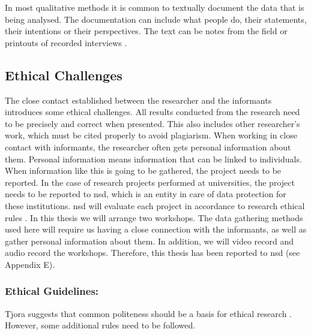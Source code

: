 In most qualitative methods it is common to textually document the data that is being analysed. The documentation can include what people do, their statements, their intentions or their perspectives. The text can be notes from the field or printouts of  recorded interviews \cite{qualitative}. 

\subsection{Ethical Challenges}
\label{sec:ethicalchallenges}
The close contact established between the researcher and the informants introduces some ethical challenges. All results conducted from the research need to be precisely and correct when presented. This also includes other researcher's work, which must be cited properly to avoid plagiarism. When working in close contact with informants, the researcher often gets personal information about them. Personal information means information that can be linked to individuals. When information like this is going to be gathered, the project needs to be reported. In the case of research projects performed at universities, the project needs to be reported to \ac{nsd}, which is an entity in care of data protection for these institutions. \ac{nsd} will evaluate each project in accordance to research ethical rules \cite{qualitative}. In this thesis we will arrange two workshops. The data gathering methods used here will require us having a close connection with the informants, as well as gather personal information about them. In addition, we will video record and audio record the workshops. Therefore, this thesis has been reported to \ac{nsd} (see Appendix E). 

\subsubsection{Ethical Guidelines:}
Tjora suggests that common politeness should be a basis for ethical research \cite{tjora}. However, some additional rules need to be followed. 

